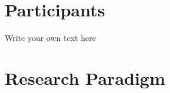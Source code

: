 \documentclass[11pt, a4paper]{article}
\begin{document}
\section*{Participants}

Write your own text here

\section*{Research Paradigm}
\end{document}
